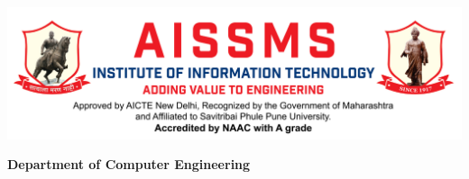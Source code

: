 \documentclass[12pt]{report}	%
\begin{document}
	\begin{titlepage}   
\includegraphics[width=0.9\linewidth]{IOIT_long.jpg}  %

\begin{center}
 \bf{\Large Department of Computer Engineering}
\end{center}


\end{titlepage}
\end{document}
